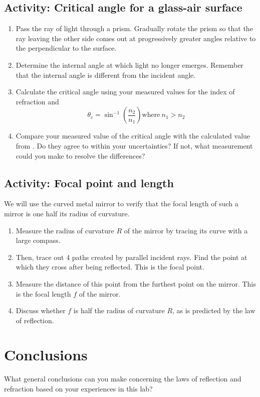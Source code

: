 \subsection{Activity: Critical angle for a glass-air surface}
\begin{enumerate}
\item Pass the ray of light through a prism.  Gradually rotate the prism so that the ray leaving the other side comes out at progressively greater angles relative to the perpendicular to the surface.  
	\item Determine the internal angle at which light no longer emerges.  Remember that the internal angle is different from the incident angle.
	\item Calculate the critical angle using your measured values for the index of refraction and 
\begin{equation} \label{e:critang}
	\theta_c = \sin^{-1} \left(\frac{n_2}{n_1}\right) \text{where} \ n_1 > n_2
\end{equation}
	\item Compare your measured value of the critical angle with the calculated value from .  Do they agree to within your uncertainties?  If not, what measurement could you make to resolve the differences?	
\end{enumerate}

\subsection{Activity: Focal point and length}
We will use the curved metal mirror to verify that the focal length of such a mirror is one half its radius of curvature.
\begin{enumerate}
	 \item Measure the radius of curvature $R$ of the mirror by tracing its curve with a large compass.  
	 \item Then, trace out 4 paths created by parallel incident rays.  Find the point at which they cross after being reflected.  This is the focal point. 
	 \item Measure the distance of this point from the furthest point on the mirror.  This is the focal length $f$ of the mirror.  
	 \item Discuss whether $f$ is half the radius of curvature $R$, as is predicted by the law of reflection.
\end{enumerate}
	
\section{Conclusions}
  What general conclusions can you make concerning the laws of reflection and refraction based on your experiences in this lab?
 
 
\endinput